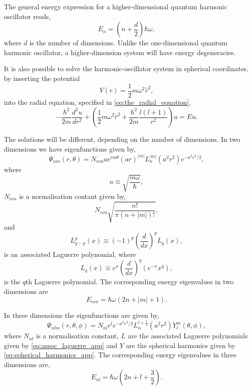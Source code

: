 The general energy expression for a higher-dimensional 
quantum harmonic oscillator reads,
\begin{equation}
    E_n = \left(n + \frac{d}{2} \right)\hbar\omega,
\end{equation}
where $d$ is the number of dimensions. Unlike the one-dimensional quantum harmonic 
oscillator, a higher-dimension system will have energy degeneracies.

It is also possible to solve the harmonic-oscillator system in 
spherical coordinates, by inserting the potential
\begin{equation*}    
    V(r) = \frac{1}{2}m \omega^2\hat{r}^2,
\end{equation*}
into the radial equation, specified in \autoref{eq:the_radial_equation},
\begin{equation}
    -\frac{\hbar^2}{2m}\frac{d^2u}{dr^2}
    + \left(
        \frac{1}{2}m\omega^2\hat{r}^2 
        + \frac{\hbar^2}{2m}\frac{l(l + 1)}{r^2} 
    \right)u = Eu.
\end{equation}

The solutions will be different, depending on the number of dimensions.
In two dimensions we have eigenfunctions given by,
\begin{equation}
    \Psi_{nm} (r,\theta) 
    = N_{nm}ae^{im\theta}(ar)^{|m|}L_n^{|m|}(a^2r^2)e^{-a^2r^2/2},
\end{equation}
where 
\begin{equation*}
    a \equiv \sqrt{\frac{m\omega}{\hbar}},
\end{equation*}
$N_{nm}$ is a normalisation contant given by,
\begin{equation*}
    N_{nm} \sqrt{\frac{n!}{\pi(n + |m|)!}},
\end{equation*}
and
\begin{equation}
    \label{eq:assoc_laguerre_app}
    L^p_{q-p}(x) \equiv (-1)^p \left(\frac{d}{dx} \right)^p L_q(x),
\end{equation}
is an associated Laguerre polynomial, where 
\begin{equation}
    L_q(x) \equiv e^x \left(\frac{d}{dx} \right)^q (e^{-x}x^q),
\end{equation}
is the $q$th Laguerre polynomial. The corresponding energy eigenvalues in 
two dimensions are 
\begin{equation}
    E_{nm} = \hbar\omega(2n + |m| + 1).
\end{equation}

In three dimensions the eigenfunctions are given by,
\begin{equation}
    \Psi_{nlm}(r,\theta,\phi)
    =
    N_{nl}r^l e^{-a^2r^2/2}L_n^{l + \frac{1}{2}}(a^2r^2)Y^m_l(\theta,\phi),
\end{equation}
where $N_{nl}$ is a normalisation constant, $L$ are the associated Laguerre 
polynomials given by \autoref{eq:assoc_laguerre_app} and 
$Y$ are the spherical harmonics given by \autoref{eq:spherical_harmonics_app}.
The corresponding energy eigenvalues in three dimensions are,
\begin{equation}
    E_{nl} = \hbar\omega\left(2n + l + \frac{3}{2}\right).
\end{equation}

\clearemptydoublepage
